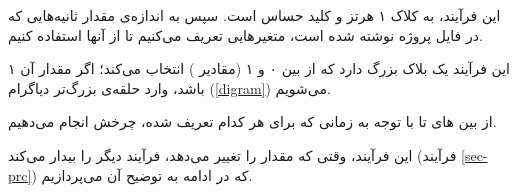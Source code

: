 \documentclass[dvipsnames, svgnames, x11names, a4paper, 11pt]{article}
\begin{document}
این فرآیند، به کلاک ۱ هرتز و کلید  حساس است. سپس به اندازه‌ی مقدار ثانیه‌هایی که در فایل پروژه نوشته شده است، متغیر‌هایی تعریف می‌کنیم تا از آنها استفاده کنیم.

این فرآیند یک بلاک  بزرگ دارد که از بین ۰ و ۱ (مقادیر ) انتخاب می‌کند؛ اگر مقدار آن ۱ باشد، وارد حلقه‌ی بزرگ‌‌تر دیاگرام (\ref{digram}) می‌شویم.

از بین 
های
تا
با توجه به زمانی که برای هر کدام تعریف شده، چرخش انجام می‌دهیم.

این فرآیند، وقتی که مقدار 
را تغییر می‌دهد، فرآیند دیگر را بیدار می‌کند (فرآیند \ref{sec-prc}) که در ادامه به توضیح آن می‌پردازیم.
\end{document}
